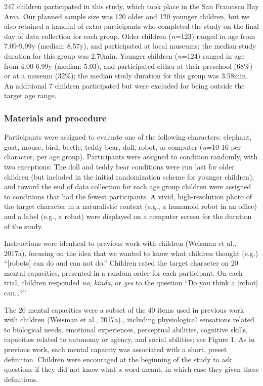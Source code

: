 \documentclass[10pt, letterpaper]{article}
\begin{document}
247 children participated in this study, which took place in the San
Francisco Bay Area. Our planned sample size was 120 older and 120
younger children, but we also retained a handful of extra participants
who completed the study on the final day of data collection for each
group. Older children (\emph{n}=123) ranged in age from 7.09-9.99y
(median: 8.57y), and participated at local museums; the median study
duration for this group was 2.70min. Younger children (\emph{n}=124)
ranged in age from 4.00-6.99y (median: 5.03), and participated either at
their preschool (68\%) or at a museum (32\%); the median study duration
for this group was 3.58min. An additional 7 children participated but
were excluded for being outside the target age range.

\subsubsection{Materials and procedure}\label{materials-and-procedure}

Participants were assigned to evaluate one of the following characters:
elephant, goat, mouse, bird, beetle, teddy bear, doll, robot, or
computer (\emph{n}=10-16 per character, per age group). Participants
were assigned to condition randomly, with two exceptions: The doll and
teddy bear conditions were run last for older children (but included in
the initial randomization scheme for younger children); and toward the
end of data collection for each age group children were assigned to
conditions that had the fewest participants. A vivid, high-resolution
photo of the target character in a naturalistic context (e.g., a
humanoid robot in an office) and a label (e.g., a robot) were displayed
on a computer screen for the duration of the study.

Instructions were identical to previous work with children (Weisman et
al., 2017a), focusing on the idea that we wanted to know what children
thought (e.g.) ``{[}robots{]} can do and can not do.'' Children rated
the target character on 20 mental capacities, presented in a random
order for each participant. On each trial, children responded \emph{no},
\emph{kinda}, or \emph{yes} to the question ``Do you think a {[}robot{]}
can\ldots{}?''

The 20 mental capacities were a subset of the 40 items used in previous
work with children (Weisman et al., 2017a)., including physiological
sensations related to biological needs, emotional experiences,
perceptual abilities, cognitive skills, capacities related to autonomy
or agency, and social abilities; see Figure 1. As in previous work, each
mental capacity was associated with a short, preset definition. Children
were encouraged at the beginning of the study to ask questions if they
did not know what a word meant, in which case they given these
definitions.
\end{document}
